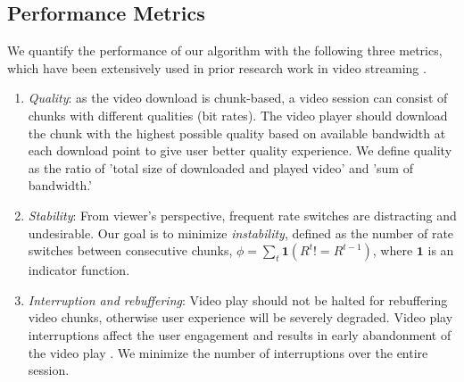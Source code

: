 \subsection{Performance Metrics}\label{subsec:metrics}

We quantify the performance of our algorithm with the following three
metrics, which have been extensively used in prior research work in video
streaming 
\cite{Qava, Avis,VideoMeasurement, Festive}. 


\begin{enumerate}
\item\textit{Quality}: as the video download is chunk-based, a video
  session can consist of chunks with different qualities (bit
  rates). The video player should download the chunk with the highest
  possible quality based on available bandwidth at each download point
  to give user better quality experience. We define quality as the
  ratio of 'total size of downloaded and played video' and 'sum of bandwidth.'

\item\textit{Stability}: From viewer's perspective, frequent rate
  switches are distracting and undesirable. Our goal is to minimize 
  \emph{instability}, defined as the number of rate switches between consecutive chunks, $\phi= \sum\limits_t
  \mathbf{1}(R^t!=R^{t-1})$, where $\mathbf{1}$ is an indicator
  function. 
  
\item\textit{Interruption and rebuffering}: Video play should not be
  halted for rebuffering video chunks, otherwise user experience will
  be severely degraded. Video play interruptions affect the user
  engagement and results in early abandonment of the video play
  . We minimize the 
  number of interruptions over the entire session. %
\end{enumerate}

